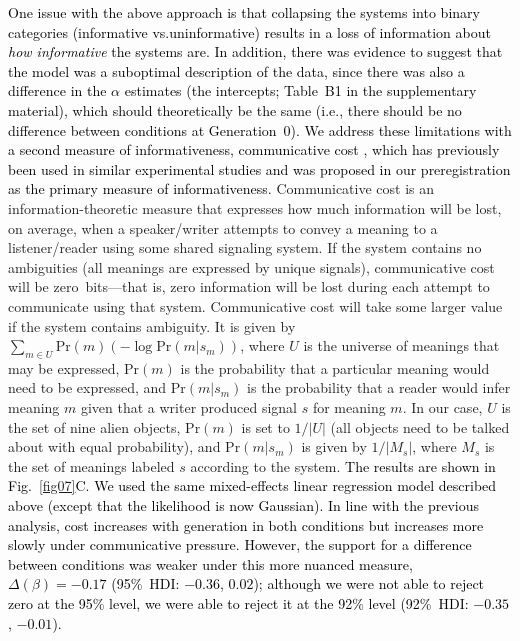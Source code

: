\documentclass[doc,biblatex]{apa7}
\newcommand\firstrevision[1]{\textcolor{black}{#1}}
\newcommand\secondrevision[1]{\textcolor{black}{#1}}
\begin{document}
\firstrevision{One issue with the above approach is that collapsing the systems into binary categories (informative vs.\@ uninformative) results in a loss of information about \textit{how informative} the systems are. In addition, there was evidence to suggest that the model was a suboptimal description of the data, since there was also a difference in the $\alpha$ estimates (the intercepts\secondrevision{; Table~B1 in the supplementary material}), which should theoretically be the same (i.e., there should be no difference between conditions at Generation~0). We address these limitations with a second measure of informativeness, communicative cost \parencite{KempRegier:2012, Kemp:2018, Regier:2015}, which has previously been used in similar experimental studies \parencite{Carr:2020, Carstensen:2015, Smith:2020} and was proposed in our preregistration as the primary measure of informativeness.} Communicative cost is an information-theoretic measure that expresses how much information will be lost, on average, when a speaker/writer attempts to convey a meaning to a listener/reader using some shared signaling system. If the system contains no ambiguities (all meanings are expressed by unique signals), communicative cost will be zero~bits---that is, zero information will be lost during each attempt to communicate using that system. Communicative cost will take some larger value if the system contains ambiguity. It is given by $\sum_{m \in U} \mathrm{Pr}(m) ( -\log \mathrm{Pr}(m|s_m) )$, where $U$ is the universe of meanings that may be expressed, $\mathrm{Pr}(m)$ is the probability that a particular meaning would need to be expressed, and $\mathrm{Pr}(m|s_m)$ is the probability that a reader would infer meaning $m$ given that a writer produced signal $s$ for meaning $m$. In our case, $U$ is the set of nine alien objects, $\mathrm{Pr}(m)$ is set to $1/|U|$ (all objects need to be talked about with equal probability), and $\mathrm{Pr}(m|s_m)$ is given by $1/|M_s|$, where $M_s$ is the set of meanings labeled $s$ according to the system. \firstrevision{The results are shown in Fig.~\ref{fig07}C. We used the same mixed-effects linear regression model described above (except that the likelihood is now Gaussian). In line with the previous analysis, cost increases with generation in both conditions but increases more slowly under communicative pressure. However, the support for a difference between conditions was weaker under this more nuanced measure, $\Delta(\beta) = -0.17$ (95\%~HDI: $-0.36$, $0.02$); although we were not able to reject zero at the 95\% level, we were able to reject it at the 92\% level (92\%~HDI: $-0.35$, $-0.01$).}
\end{document}
